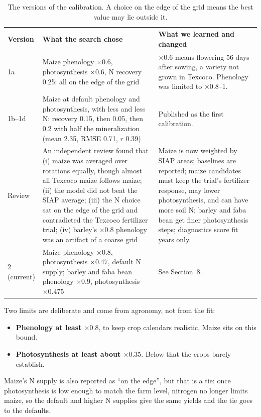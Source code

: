 \documentclass[11pt,a4paper]{article}
\begin{document}
\begin{table}[H]
\centering\small
\begin{tabularx}{\linewidth}{lYY}
\toprule
Version & What the search chose & What we learned and changed \\
\midrule
1a & Maize phenology \(\times 0.6\), photosynthesis \(\times 0.6\), N recovery 0.25: all on the edge of the grid &
  \(\times 0.6\) means flowering 56 days after sowing, a variety not grown in Texcoco. Phenology was limited to
  \(\times 0.8\)--1. \\
1b--1d & Maize at default phenology and photosynthesis, with less and less N: recovery 0.15, then 0.05, then 0.2 with
  half the mineralization (mean 2.35, RMSE 0.71, \(r\) 0.39) & Published as the first calibration. \\
Review & An independent review found that (i) maize was averaged over rotations equally, though almost all Texcoco
  maize follows maize; (ii) the model did not beat the SIAP average; (iii) the N choice sat on the edge of the grid
  and contradicted the Texcoco fertilizer trial; (iv) barley's \(\times 0.8\) phenology was an artifact of a coarse
  grid & Maize is now weighted by SIAP areas; baselines are reported; maize candidates must keep the trial's fertilizer
  response, may lower photosynthesis, and can have more soil N; barley and faba bean get finer photosynthesis
  steps; diagnostics score fit years only. \\
2 (current) & Maize phenology \(\times 0.8\), photosynthesis \(\times 0.47\), default N supply; barley and faba bean
  phenology \(\times 0.9\), photosynthesis \(\times 0.475\) & See Section~8. \\
\bottomrule
\end{tabularx}
\caption{The versions of the calibration. A choice on the edge of the grid means the best value may lie outside it.}
\end{table}

Two limits are deliberate and come from agronomy, not from the fit:
\begin{itemize}[nosep]
  \item \textbf{Phenology at least \(\times 0.8\)}, to keep crop calendars realistic. Maize sits on this bound.
  \item \textbf{Photosynthesis at least about \(\times 0.35\)}. Below that the crops barely establish.
\end{itemize}
Maize's N supply is also reported as ``on the edge'', but that is a tie: once photosynthesis is low enough to match
the farm level, nitrogen no longer limits maize, so the default and higher N supplies give the same yields and the
tie goes to the defaults.
\end{document}
